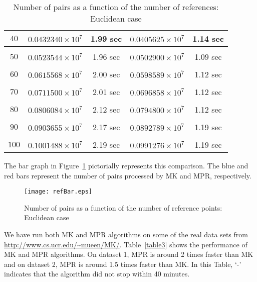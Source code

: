 \documentclass{article}
\theoremstyle{definition}
\theoremstyle{remark}
\begin{document}
\begin{table}[ht]
{\begin{tabular}{|c|c|c|c|c|}
$40$ & $0.0432340\times10^7$ & 1.99 sec & $0.0405625\times10^7$ & 1.14 sec\\ \hline                  & & & &\\
$50$ & $0.0523544\times10^7$ & 1.96 sec & $0.0502900\times10^7$ & 1.09 sec\\ [1ex]      \hline                  & & & &\\
$60$ & $0.0615568\times10^7$ & 2.00 sec & $0.0598589\times10^7$ & 1.12 sec\\ [1ex]      \hline                  & & & &\\
$70$ & $0.0711500\times10^7$ & 2.01 sec & $0.0696858\times10^7$ & 1.12 sec\\ [1ex]      \hline                  & & & &\\
$80$ & $0.0806084\times10^7$ & 2.12 sec & $0.0794800\times10^7$ & 1.12 sec\\ [1ex]      \hline
& & & &\\
$90$ & $0.0903655\times10^7$ & 2.17 sec & $0.0892789\times10^7$ & 1.19 sec\\ [1ex]      \hline
& & & &\\
$100$ & $0.1001488\times10^7$ & 2.19 sec & $0.0991276\times10^7$ & 1.19 sec\\ [1ex]      \hline
\end{tabular}}
\vspace{0.2in}
\caption{Number of pairs as a function of \protect\linebreak the number of references: Euclidean case}\label{table2} \end{table}

The bar graph in Figure~\ref{figure3} pictorially represents this comparison. The blue and red bars represent the number of pairs processed by MK and MPR, respectively.

\begin{figure}[h]
\texttt{[image: refBar.eps]}
\caption{Number of pairs as a function of the number of reference points: Euclidean case}\label{figure3}
\end{figure}

We have run both MK and MPR algorithms on some of the real data sets from \url{http://www.cs.ucr.edu/~mueen/MK/}. Table~\ref{table3} shows the performance of MK and MPR algorithms. On dataset 1, MPR is around 2 times faster than MK and on dataset 2, MPR is around 1.5 times faster than MK. In this Table, `-' indicates that the algorithm did not stop within 40 minutes.
\end{document}
